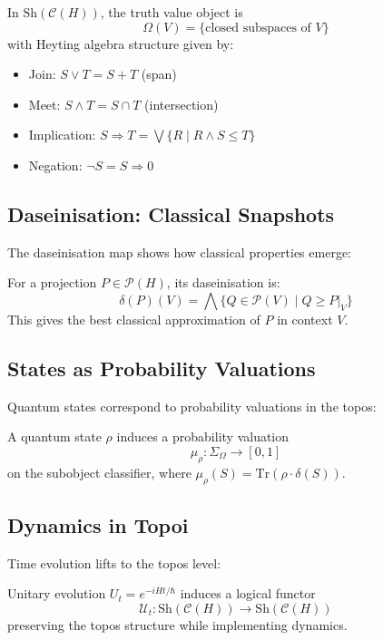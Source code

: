 \begin{definition}
In $\text{Sh}(\mathcal{C}(H))$, the truth value object is
\[
\Omega(V) = \{\text{closed subspaces of } V\}
\]
with Heyting algebra structure given by:
\begin{itemize}
\item Join: $S \vee T = S + T$ (span)
\item Meet: $S \wedge T = S \cap T$ (intersection)
\item Implication: $S \Rightarrow T = \bigvee\{R \mid R \wedge S \leq T\}$
\item Negation: $\neg S = S \Rightarrow 0$
\end{itemize}
\end{definition}

\subsection{Daseinisation: Classical Snapshots}

The daseinisation map shows how classical properties emerge:

\begin{definition}[Daseinisation]
For a projection $P \in \mathcal{P}(H)$, its daseinisation is:
\[
\delta(P)(V) = \bigwedge\{Q \in \mathcal{P}(V) \mid Q \geq P|_V\}
\]
This gives the best classical approximation of $P$ in context $V$.
\end{definition}

\subsection{States as Probability Valuations}

Quantum states correspond to probability valuations in the topos:

\begin{definition}
A quantum state $\rho$ induces a probability valuation
\[
\mu_\rho: \Sigma_{\Omega} \to [0,1]
\]
on the subobject classifier, where $\mu_\rho(S) = \text{Tr}(\rho \cdot \delta(S))$.
\end{definition}

\subsection{Dynamics in Topoi}

Time evolution lifts to the topos level:

\begin{theorem}
Unitary evolution $U_t = e^{-iHt/\hbar}$ induces a logical functor
\[
\mathcal{U}_t: \text{Sh}(\mathcal{C}(H)) \to \text{Sh}(\mathcal{C}(H))
\]
preserving the topos structure while implementing dynamics.
\end{theorem}

